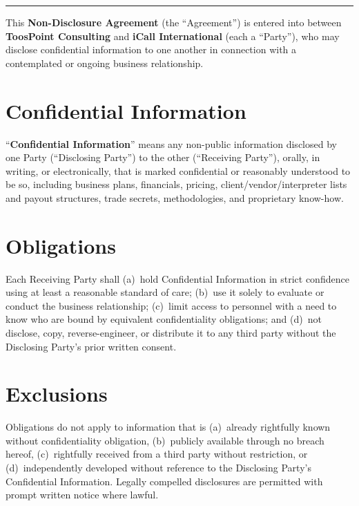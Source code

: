 \documentclass{toospoint}
\begin{document}

\thispagestyle{fancy}

\vspace{4pt}
{\color{TPOrange}\rule{\linewidth}{1pt}}
\vspace{6pt}

{\sffamily\footnotesize\noindent
This \textbf{Non-Disclosure Agreement} (the ``Agreement'') is entered into between
\textbf{ToosPoint Consulting} and \textbf{iCall International} (each a
``Party''), who may disclose confidential information to one another in connection
with a contemplated or ongoing business relationship.\par}

\small

\section{Confidential Information}
\noindent``\textbf{Confidential Information}'' means any non-public information disclosed
by one Party (``Disclosing Party'') to the other (``Receiving Party''), orally, in
writing, or electronically, that is marked confidential or reasonably understood
to be so, including business plans, financials, pricing, client/vendor/interpreter
lists and payout structures, trade secrets, methodologies, and proprietary know-how.

\section{Obligations}
\noindent Each Receiving Party shall (a)~hold Confidential Information in strict confidence
using at least a reasonable standard of care; (b)~use it solely to evaluate or
conduct the business relationship; (c)~limit access to personnel with a need to
know who are bound by equivalent confidentiality obligations; and (d)~not disclose,
copy, reverse-engineer, or distribute it to any third party without the Disclosing
Party's prior written consent.

\section{Exclusions}
\noindent Obligations do not apply to information that is (a)~already rightfully known
without confidentiality obligation, (b)~publicly available through no breach
hereof, (c)~rightfully received from a third party without restriction, or
(d)~independently developed without reference to the Disclosing Party's
Confidential Information. Legally compelled disclosures are permitted with prompt
written notice where lawful.
\end{document}
